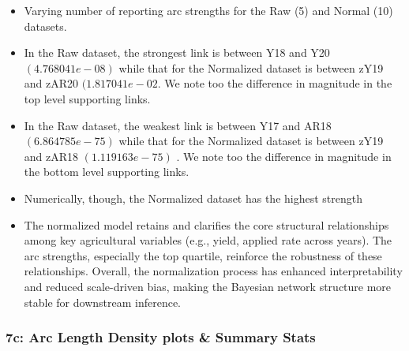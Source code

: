 \documentclass[
]{article}
\begin{document}
\begin{itemize}
\item
  Varying number of reporting arc strengths for the Raw (5) and Normal
  (10) datasets.
\item
  In the Raw dataset, the strongest link is between Y18 and Y20
  \((4.768041e-08)\) while that for the Normalized dataset is between
  zY19 and zAR20 \((1.817041e-02\). We note too the difference in
  magnitude in the top level supporting links.
\item
  In the Raw dataset, the weakest link is between Y17 and AR18
  \((6.864785e-75)\) while that for the Normalized dataset is between
  zY19 and zAR18 \((1.119163e-75)\) . We note too the difference in
  magnitude in the bottom level supporting links.
\item
  Numerically, though, the Normalized dataset has the highest strength
\item
  The normalized model retains and clarifies the core structural
  relationships among key agricultural variables (e.g., yield, applied
  rate across years). The arc strengths, especially the top quartile,
  reinforce the robustness of these relationships. Overall, the
  normalization process has enhanced interpretability and reduced
  scale-driven bias, making the Bayesian network structure more stable
  for downstream inference.
\end{itemize}

\subsubsection{7c: Arc Length Density plots \& Summary
Stats}\label{c-arc-length-density-plots-summary-stats}
\end{document}
